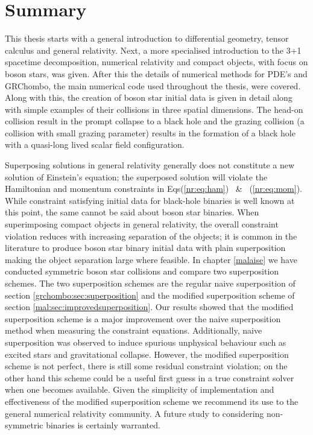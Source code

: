 \section{Summary}

This thesis starts with a general introduction to differential geometry,
tensor calculus and general relativity. Next, a more specialised introduction to the
3+1 spacetime decomposition, numerical relativity and compact objects, with focus
on boson stars, was given. After this the details of
numerical methods for PDE's and {\sc GRChombo}, the main numerical code used throughout
the thesis, were covered. Along with this, the creation of boson star initial data is given in
detail along with simple examples of their collisions in three spatial dimensions.
The head-on collision result in the prompt collapse to a black hole and the grazing
collision (a collision with small grazing parameter) results in the formation of
a black hole with a quasi-long lived scalar field configuration.

Superposing solutions in general relativity generally does not constitute a new
solution of Einstein's equation; the superposed solution will violate the Hamiltonian
and momentum constraints in Eqs(\ref{nr:eq:ham}) \, \& \, (\ref{nr:eq:mom}). While
constraint satisfying initial data for black-hole binaries is well known at this point,
the same cannot be said about boson star binaries. When superimposing
compact objects in general relativity, the overall constraint violation reduces with
increasing separation of the objects; it is common in the literature to produce
boson star binary initial data with plain superposition making the object separation
large where feasible. In chapter \ref{malaise} we have conducted symmetric boson
star collisions and compare two superposition schemes. The two superposition schemes
are the regular naive superposition of section \ref{grchombo:sec:superposition}
and the modified superposition scheme of section \ref{mal:sec:improvedsuperposition}.
Our results showed that the modified superposition scheme is a major improvement
over the naive superposition method when measuring the constraint equations. Additionally,
naive superposition was observed to induce spurious unphysical behaviour such as
excited stars and gravitational collapse. However, the modified superposition
scheme is not perfect, there is still some residual constraint violation; on the
other hand this scheme could be a useful first guess in a true constraint solver
when one becomes available. Given the simplicity of implementation and
effectiveness of the modified superposition scheme we recommend its use to the
general numerical relativity community. A future study to considering non-symmetric
binaries is certainly warranted.

